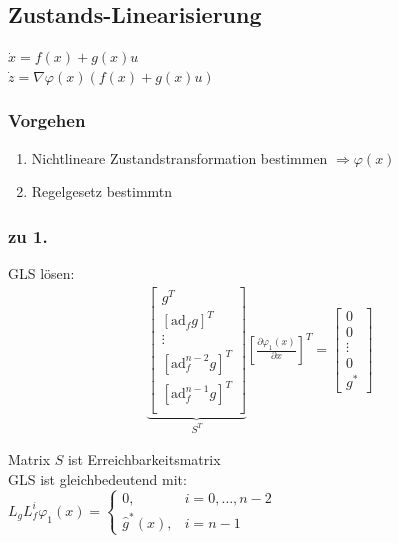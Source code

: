 \documentclass[german]{latex4ei/latex4ei_sheet}
\begin{document}
\begin{sectionbox}
\subsection{Zustands-Linearisierung}
$\dot{x} = f(x) + g(x)u$ \\
$\dot{z} = \nabla \varphi(x) \left( f(x) + g(x)u \right)$

\subsubsection{Vorgehen}
\begin{enumerate}
  \item Nichtlineare Zustandstransformation bestimmen $\Rightarrow \varphi(x)$
  \item Regelgesetz bestimmtn
\end{enumerate}

\subsubsection{zu 1.}
GLS lösen: \\
\begin{align*}
  \underbrace{
  \begin{bmatrix}
    g^T \\
    [\text{ad}_f g]^T \\
    \vdots \\
    [\text{ad}^{n-2}_f g]^T \\
    [\text{ad}^{n-1}_f g]^T \\
  \end{bmatrix}
  }_{S^T}
  \left[ \frac{\partial \varphi_1(x)}{\partial x} \right]^T
  =
  \begin{bmatrix}
    0 \\
    0 \\
    \vdots \\
    0 \\
    g^*
  \end{bmatrix}
\end{align*}

Matrix $S$ ist Erreichbarkeitsmatrix \\

GLS ist gleichbedeutend mit: \\
$ L_g L_f^i \varphi_1(x) =
\begin{cases}
  0, & i = 0, \dots, n-2 \\
  \hat{g}^*(x), & i = n-1
\end{cases}$


\end{sectionbox}
\end{document}
